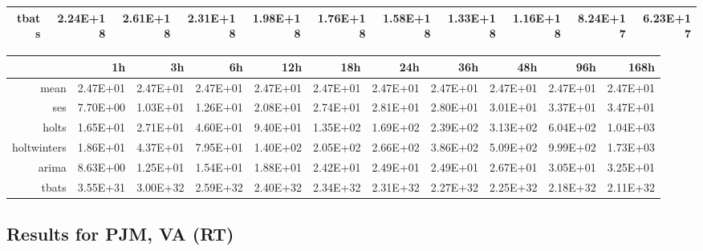 \begin{landscape}
\begin{table}[ht]
\begin{tabular}{rrrrrrrrrrr}
  tbats & 2.24E+18 & 2.61E+18 & 2.31E+18 & 1.98E+18 & 1.76E+18 & 1.58E+18 & 1.33E+18 & 1.16E+18 & 8.24E+17 & 6.23E+17 \\ 
   \hline
\end{tabular}
\end{table}
\begin{table}[ht]
\centering
\begin{tabular}{rrrrrrrrrrr}
  \hline
 & 1h & 3h & 6h & 12h & 18h & 24h & 36h & 48h & 96h & 168h \\ 
  \hline
mean & 2.47E+01 & 2.47E+01 & 2.47E+01 & 2.47E+01 & 2.47E+01 & 2.47E+01 & 2.47E+01 & 2.47E+01 & 2.47E+01 & 2.47E+01 \\ 
  ses & 7.70E+00 & 1.03E+01 & 1.26E+01 & 2.08E+01 & 2.74E+01 & 2.81E+01 & 2.80E+01 & 3.01E+01 & 3.37E+01 & 3.47E+01 \\ 
  holts & 1.65E+01 & 2.71E+01 & 4.60E+01 & 9.40E+01 & 1.35E+02 & 1.69E+02 & 2.39E+02 & 3.13E+02 & 6.04E+02 & 1.04E+03 \\ 
  holtwinters & 1.86E+01 & 4.37E+01 & 7.95E+01 & 1.40E+02 & 2.05E+02 & 2.66E+02 & 3.86E+02 & 5.09E+02 & 9.99E+02 & 1.73E+03 \\ 
  arima & 8.63E+00 & 1.25E+01 & 1.54E+01 & 1.88E+01 & 2.42E+01 & 2.49E+01 & 2.49E+01 & 2.67E+01 & 3.05E+01 & 3.25E+01 \\ 
  tbats & 3.55E+31 & 3.00E+32 & 2.59E+32 & 2.40E+32 & 2.34E+32 & 2.31E+32 & 2.27E+32 & 2.25E+32 & 2.18E+32 & 2.11E+32 \\ 
   \hline
\end{tabular}
\end{table}

\subsection{Results for PJM, VA (RT)}


\end{landscape}
